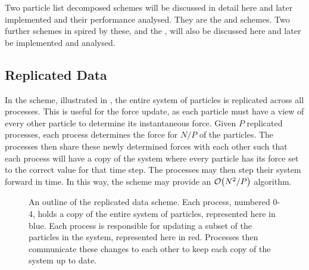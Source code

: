 %
Two particle list decomposed schemes will be discussed in detail here and
later implemented and their performance analysed.
%
They are the \replicateddata{} and \systolicloop{} schemes.
%
Two further schemes in spired by these, \sharedandreplicateddata{} and the
\replicatedsystolicloop{}, will also be discussed here and
later be implemented and analysed.



\subsection{Replicated Data}
\label{sec:background:subsec:replicated_data}

%
In the \replicateddata{} scheme, illustrated in
,
the entire system of particles is replicated across all processes.
%
This is useful for the force update, as each particle must have a view of
every other particle to determine its instantaneous force.
%
Given $P$ replicated processes,
each process determines the force for $N/P$ of the particles.
%
The processes then share these newly determined forces with each other
such that each process will have a copy of the system where every
particle has its force set to the correct value for that time step.
%
The processes may then step their system forward in time.
%
In this way, the \replicateddata{} scheme may provide
an $\mathcal{O}{\left({ N^2/P }\right)}$ algorithm.


\begin{figure}
    \begin{center}
    \end{center}
    \caption{
        An outline of the replicated data scheme.
        Each process, numbered 0-4,
        holds a copy of the entire system of particles,
        represented here in blue.
        Each process is responsible for updating a subset of the
        particles in the system, represented here in red.
        Processes then communicate these changes to each other
        to keep each copy of the system up to date.
    }
    \label{fig:replicated_data_illustration}
\end{figure}


